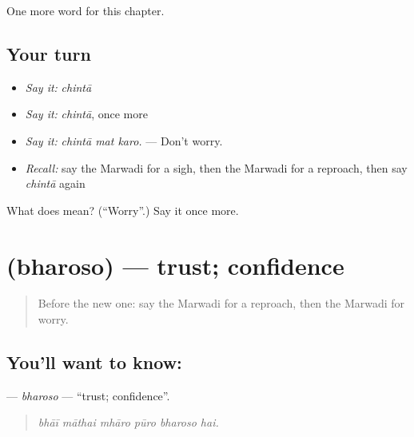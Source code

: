 \begin{grammarlens}[title={What you've built}]
One more word for this chapter.
\end{grammarlens}

\subsection*{Your turn}
\begin{itemize}
\raggedright
  \item \emph{Say it:} \emph{chintā}
  \item \emph{Say it:} \emph{chintā}, once more
  \item \emph{Say it:} \emph{chintā mat karo.} — Don't worry.
  \item \emph{Recall:} say the Marwadi for a sigh, then the Marwadi for a reproach, then say \emph{chintā} again
\end{itemize}

\begin{tcolorbox}[breakable,colback=teal!4,colframe=teal!35!black,title={Before you move on}]
What does  mean? (\textquotedblleft{}Worry\textquotedblright{}.) Say it once more.
\end{tcolorbox}
\section[\texorpdfstring{\mw{भरोसो} (bharoso)}{भरोसो (bharoso)}]{ (bharoso) — trust; confidence}

\label{lesson:MW-C258-bharoso}



\begin{quote}
Before the new one: say the Marwadi for a reproach, then the Marwadi for worry.
\end{quote}

\subsection*{You'll want to know: }
\textbf{} — \emph{bharoso} — \textquotedblleft{}trust; confidence\textquotedblright{}.

\begin{quote}
     
\end{quote}

\begin{quote}
\emph{bhāī māthai mhāro pūro bharoso hai.}
\end{quote}

